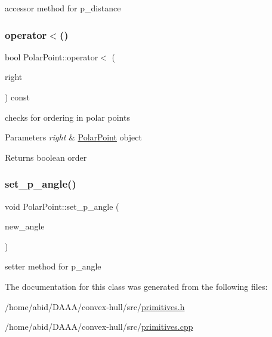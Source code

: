 accessor method for p\+\_\+distance \mbox{\label{class_polar_point_a705e9afe8f23c0cac34b25a006c574e8}} 
\subsubsection{\texorpdfstring{operator$<$()}{operator<()}}
{\footnotesize\ttfamily bool Polar\+Point\+::operator$<$ (\begin{DoxyParamCaption}\item[{const \mbox{\hyperlink{class_polar_point}{Polar\+Point}} \&}]{right }\end{DoxyParamCaption}) const}

checks for ordering in polar points 
\begin{DoxyParams}{Parameters}
{\em right} & \mbox{\hyperlink{class_polar_point}{Polar\+Point}} object \\
\hline
\end{DoxyParams}
\begin{DoxyReturn}{Returns}
boolean order 
\end{DoxyReturn}
\mbox{\label{class_polar_point_ac63f2017507c73c4bd3c5f89994627ef}} 
\subsubsection{\texorpdfstring{set\_p\_angle()}{set\_p\_angle()}}
{\footnotesize\ttfamily void Polar\+Point\+::set\+\_\+p\+\_\+angle (\begin{DoxyParamCaption}\item[{\mbox{\hyperlink{primitives_8h_a41ee332ff1a31807cb838b616c186dd7}{angle}}}]{new\+\_\+angle }\end{DoxyParamCaption})}

setter method for p\+\_\+angle 

The documentation for this class was generated from the following files\+:\begin{DoxyCompactItemize}
\item 
/home/abid/\+D\+A\+A\+A/convex-\/hull/src/\mbox{\hyperlink{primitives_8h}{primitives.\+h}}\item 
/home/abid/\+D\+A\+A\+A/convex-\/hull/src/\mbox{\hyperlink{primitives_8cpp}{primitives.\+cpp}}\end{DoxyCompactItemize}
